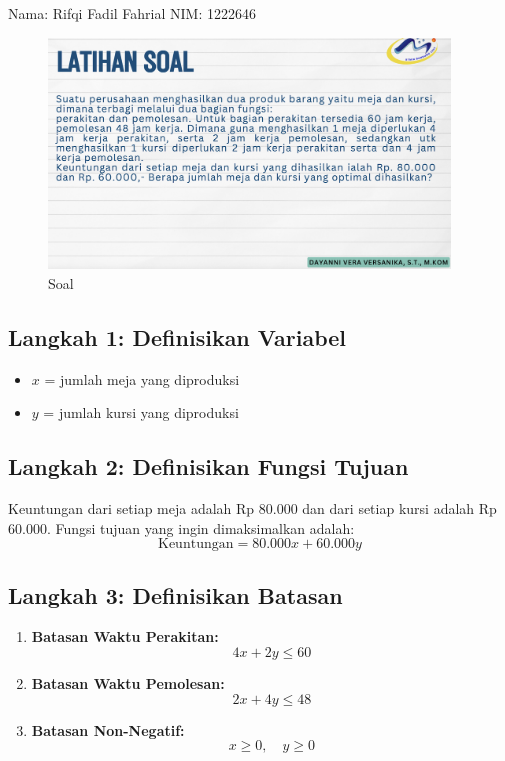 \documentclass{article}
\begin{document}
Nama: Rifqi Fadil Fahrial \newline
NIM: 1222646 \newline



\begin{figure}
  \begin{center}
    \includegraphics[width=0.95\textwidth]{images/gambar.png}
  \end{center}
  \caption{Soal}
\end{figure}



\subsection*{Langkah 1: Definisikan Variabel}
\begin{itemize}
    \item \( x \) = jumlah meja yang diproduksi
    \item \( y \) = jumlah kursi yang diproduksi
\end{itemize}

\subsection*{Langkah 2: Definisikan Fungsi Tujuan}
Keuntungan dari setiap meja adalah Rp 80.000 dan dari setiap kursi adalah Rp 60.000. Fungsi tujuan yang ingin dimaksimalkan adalah:
\[
\text{Keuntungan} = 80.000x + 60.000y
\]

\subsection*{Langkah 3: Definisikan Batasan}
\begin{enumerate}
    \item \textbf{Batasan Waktu Perakitan:}
    \[
    4x + 2y \leq 60
    \]
    
    \item \textbf{Batasan Waktu Pemolesan:}
    \[
    2x + 4y \leq 48
    \]
    
    \item \textbf{Batasan Non-Negatif:}
    \[
    x \geq 0, \quad y \geq 0
    \]
\end{enumerate}
\end{document}
